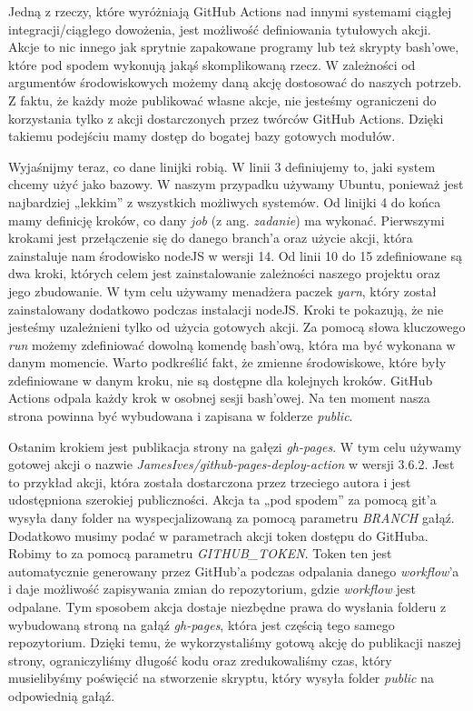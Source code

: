 \par
Jedną z rzeczy, które wyróżniają GitHub Actions nad innymi systemami ciągłej integracji/ciągłego dowożenia, jest możliwość definiowania tytułowych akcji. Akcje to nic innego jak sprytnie zapakowane programy lub też skrypty bash'owe, które pod spodem wykonują jakąś skomplikowaną rzecz. W zależności od argumentów środowiskowych możemy daną akcję dostosować do naszych potrzeb. Z faktu, że każdy może publikować własne akcje, nie jesteśmy ograniczeni do korzystania tylko z akcji dostarczonych przez twórców GitHub Actions. Dzięki takiemu podejściu mamy dostęp do bogatej bazy gotowych modułów.
\par
Wyjaśnijmy teraz, co dane linijki robią. W linii 3 definiujemy to, jaki system chcemy użyć jako bazowy. W naszym przypadku używamy Ubuntu, ponieważ jest najbardziej „lekkim” z wszystkich możliwych systemów. Od linijki 4 do końca mamy definicję kroków, co dany \textit{job} (z ang. \textit{zadanie}) ma wykonać. Pierwszymi krokami jest przełączenie się do danego branch'a oraz użycie akcji, która zainstaluje nam środowisko nodeJS w wersji 14. Od linii 10 do 15 zdefiniowane są dwa kroki, których celem jest zainstalowanie zależności naszego projektu oraz jego zbudowanie. W tym celu używamy menadżera paczek \textit{yarn}, który został zainstalowany dodatkowo podczas instalacji nodeJS. Kroki te pokazują, że nie jesteśmy uzależnieni tylko od użycia gotowych akcji. Za pomocą słowa kluczowego \textit{run} możemy zdefiniować dowolną komendę bash'ową, która ma być wykonana w danym momencie. Warto podkreślić fakt, że zmienne środowiskowe, które były zdefiniowane w danym kroku, nie są dostępne dla kolejnych kroków. GitHub Actions odpala każdy krok w osobnej sesji bash'owej. Na ten moment nasza strona powinna być wybudowana i zapisana w folderze \textit{public}.
\par
Ostanim krokiem jest publikacja strony na gałęzi \textit{gh-pages}. W tym celu używamy gotowej akcji o nazwie \textit{JamesIves/github-pages-deploy-action} w wersji 3.6.2. Jest to przykład akcji, która została dostarczona przez trzeciego autora i jest udostępniona szerokiej publiczności. Akcja ta „pod spodem” za pomocą git'a wysyła dany folder na wyspecjalizowaną za pomocą parametru \textit{BRANCH} gałąź. Dodatkowo musimy podać w parametrach akcji token dostępu do GitHuba. Robimy to za pomocą parametru \textit{GITHUB\_TOKEN}. Token ten jest automatycznie generowany przez GitHub'a podczas odpalania danego \textit{workflow}'a i daje możliwość zapisywania zmian do repozytorium, gdzie \textit{workflow} jest odpalane. Tym sposobem akcja dostaje niezbędne prawa do wysłania folderu z wybudowaną stroną na gałąź \textit{gh-pages}, która jest częścią tego samego repozytorium. Dzięki temu, że wykorzystaliśmy gotową akcję do publikacji naszej strony, ograniczyliśmy długość kodu oraz zredukowaliśmy czas, który musielibyśmy poświęcić na stworzenie skryptu, który wysyła folder \textit{public} na odpowiednią gałąź.
